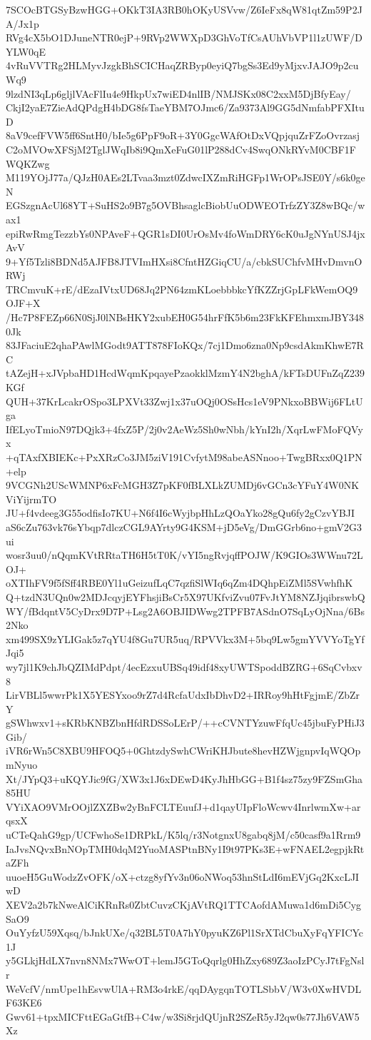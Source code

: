 7SCOcBTGSyBzwHGG+OKkT3IA3RB0hOKyUSVvw/Z6IeFx8qW81qtZm59P2JA/Jx1p
RVg4cX5bO1DJuneNTR0ejP+9RVp2WWXpD3GhVoTfCsAUhVbVP1l1zUWF/DYLW0qE
4vRuVVTRg2HLMyvJzgkBhSCICHaqZRByp0eyiQ7bgSs3Ed9yMjxvJAJO9p2cuWq9
9lzdNI3qLp6gljlVAcFlIu4e9HkpUx7wiED4nlIB/NMJSKx08C2xxM5DjBfyEay/
CkjI2yaE7ZieAdQPdgH4bDG8fsTaeYBM7OJmc6/Za9373Al9GG5dNmfabPFXItuD
8aV9cefFVW5ff6SntH0/bIe5g6PpF9oR+3Y0GgcWAfOtDxVQpjquZrFZoOvrzasj
C2oMVOwXFSjM2TglJWqIb8i9QmXeFuG01lP288dCv4SwqONkRYvM0CBF1FWQKZwg
M119YOjJ77a/QJzH0AEs2LTvaa3mzt0ZdwcIXZmRiHGFp1WrOPsJSE0Y/s6k0geN
EGSzgnAcUl68YT+SuHS2o9B7g5OVBhsaglcBiobUuODWEOTrfzZY3Z8wBQc/wax1
epiRwRmgTezzbYs0NPAveF+QGR1sDI0UrOsMv4foWmDRY6cK0uJgNYnUSJ4jxAvV
9+Yf5Tzli8BDNd5AJFB8JTVImHXsi8CfntHZGiqCU/a/cbkSUChfvMHvDmvnORWj
TRCmvuK+rE/dEzaIVtxUD68Jq2PN64zmKLoebbbkcYfKZZrjGpLFkWemOQ9OJF+X
/Hc7P8FEZp66N0SjJ0lNBsHKY2xubEH0G54hrFfK5b6m23FkKFEhmxmJBY3480Jk
83JFaciuE2qhaPAwlMGodt9ATT878FIoKQx/7cj1Dmo6zna0Np9csdAkmKhwE7RC
tAZejH+xJVpbaHD1HcdWqmKpqayePzaokklMzmY4N2bghA/kFTsDUFnZqZ239KGf
QUH+37KrLcakrOSpo3LPXVt33Zwj1x37uOQj0OSsHcs1eV9PNkxoBBWij6FLtUga
IfELyoTmioN97DQjk3+4fxZ5P/2j0v2AeWz5Sh0wNbh/kYnI2h/XqrLwFMoFQVyx
+qTAxfXBIEKc+PxXRzCo3JM5ziV191CvfytM98abeASNnoo+TwgBRxx0Q1PN+elp
9VCGNh2UScWMNP6xFcMGH3Z7pKF0fBLXLkZUMDj6vGCn3cYFuY4W0NKViYijrmTO
JU+f4vdeeg3G55odfisIo7KU+N6f4I6cWyjbpHhLzQOaYko28gQu6fy2gCzvYBJI
aS6cZu763vk76sYbqp7dlczCGL9AYrty9G4KSM+jD5eVg/DmGGrb6no+gmV2G3ui
wosr3uu0/nQqmKVtRRtaTH6H5tT0K/vYI5ngRvjqffPOJW/K9GIOs3WWnu72LOJ+
oXTIhFV9f5fSff4RBE0Yl1uGeizufLqC7qzfiSlWIq6qZm4DQhpEiZMl5SVwhfhK
Q+tzdN3UQn0w2MDJcqyjEYFhsjiBsCr5X97UKfviZvu07FvJtYM8NZJjqibrswbQ
WY/fBdqntV5CyDrx9D7P+Lsg2A6OBJIDWwg2TPFB7ASdnO7SqLyOjNna/6Bs2Nko
xm499SX9zYLIGak5z7qYU4f8Gu7UR5uq/RPVVkx3M+5bq9Lw5gmYVVYoTgYfJqi5
wy7jl1K9chJbQZIMdPdpt/4ecEzxuUBSq49idf48xyUWTSpoddBZRG+6SqCvbxv8
LirVBLl5wwrPk1X5YESYxoo9rZ7d4RcfaUdxIbDhvD2+IRRoy9hHtFgjmE/ZbZrY
gSWhwxv1+sKRbKNBZbnHfdRDSSoLErP/++cCVNTYzuwFfqUc45jbuFyPHiJ3Gib/
iVR6rWn5C8XBU9HFOQ5+0GhtzdySwhCWriKHJbute8hevHZWjgnpvIqWQOpmNyuo
Xt/JYpQ3+uKQYJic9fG/XW3x1J6xDEwD4KyJhHbGG+B1f4sz75zy9FZSmGha85HU
VYiXAO9VMrOOjlZXZBw2yBnFCLTEuufJ+d1qayUIpFloWcwv4InrlwmXw+arqsxX
uCTeQahG9gp/UCFwhoSe1DRPkL/K5lq/r3NotgnxU8gabq8jM/c50casf9a1Rrm9
IaJvsNQvxBnNOpTMH0dqM2YuoMASPtnBNy1I9t97PKs3E+wFNAEL2egpjkRtaZFh
uuoeH5GuWodzZvOFK/oX+ctzg8yfYv3n06oNWoq53hnStLdI6mEVjGq2KxcLJIwD
XEV2a2b7kNweAlCiKRnRs0ZbtCuvzCKjAVtRQ1TTCAofdAMuwa1d6mDi5CygSaO9
OuYyfzU59Xqsq/bJnkUXe/q32BL5T0A7hY0pyuKZ6Pl1SrXTdCbuXyFqYFICYc1J
y5GLkjHdLX7nvn8NMx7WwOT+lemJ5GToQqrlg0HhZxy689Z3aoIzPCyJ7tFgNslr
WeVcfV/nmUpe1hEsvwUlA+RM3o4rkE/qqDAygqnTOTLSbbV/W3v0XwHVDLF63KE6
Gwv61+tpxMICFttEGaGtfB+C4w/w3Si8rjdQUjnR2SZeR5yJ2qw0s77Jh6VAW5Xz

